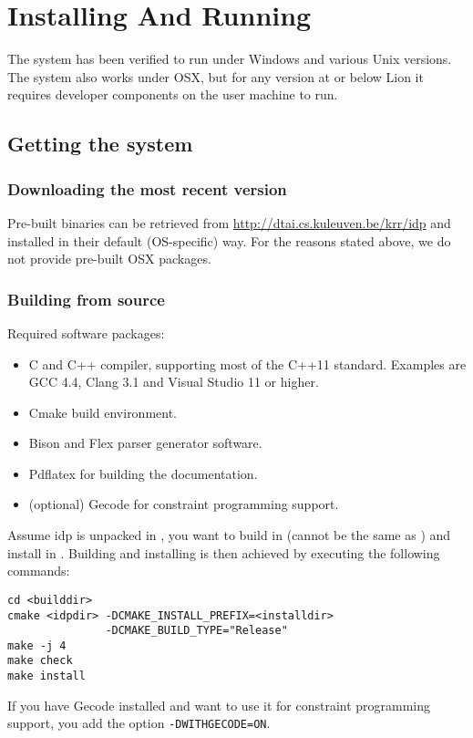 \section{Installing And Running}
The system has been verified to run under Windows and various Unix versions.
The system also works under OSX, but for any version at or below Lion it requires developer components on the user machine to run.

\subsection{Getting the system}
\subsubsection{Downloading the most recent version}
Pre-built binaries can be retrieved from \url{http://dtai.cs.kuleuven.be/krr/idp} and installed in their default (OS-specific) way.
For the reasons stated above, we do not provide pre-built OSX packages. 

\subsubsection{Building from source}
Required software packages:
\begin{itemize}
  \item C and C++ compiler, supporting most of the C++11 standard. Examples are GCC 4.4, Clang 3.1 and Visual Studio 11 or higher.
  \item Cmake build environment. 
  \item Bison and Flex parser generator software.
  \item Pdflatex for building the documentation.
  \item (optional) Gecode for constraint programming support.
\end{itemize}

Assume idp is unpacked in , you want to build in  (cannot be the same as ) and install in . Building and installing is then achieved by executing the following commands:
\begin{lstlisting}
cd <builddir>
cmake <idpdir> -DCMAKE_INSTALL_PREFIX=<installdir> 
               -DCMAKE_BUILD_TYPE="Release"
make -j 4
make check
make install
\end{lstlisting}

If you have Gecode installed and want to use it for constraint programming support, you add the option {\tt -DWITHGECODE=ON}.

